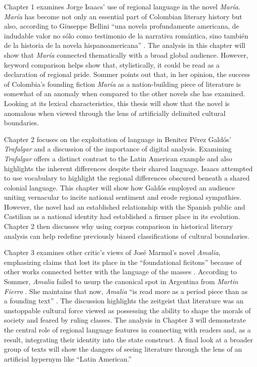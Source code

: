 \documentclass[12pt]{report}
\begin{document}
Chapter 1 examines Jorge Isaacs' use of regional language in the novel \textit{María}. 
\textit{María} has become not only an essential part of Colombian literary history but also, according to Giuseppe Bellini \enquote{una novela profundamente americana, de indudable valor no sólo como testimonio de la narrativa romántica, sino también de la historia de la novela hispanoamericana} \autocite[290]{Bellini1997}\nocite{Isaacs2012}. 
The analysis in this chapter will show that \textit{María} connected thematically with a broad global audience. 
However, keyword comparison helps show that, stylistically, it could be read as a declaration of regional pride. 
Sommer points out that, in her opinion, the success of Colombia's founding fiction \textit{María} as a nation-building piece of literature is somewhat of an anomaly when compared to the other novels she has examined. 
Looking at its lexical characteristics, this thesis will show that the novel is anomalous when viewed through the lens of artificially delimited cultural boundaries.

Chapter 2 focuses on the exploitation of language in Benitez Pérez Galdós' \textit{Trafalgar} and a discussion of the importance of digital analysis. 
Examining \textit{Trafalgar} offers a distinct contrast to the Latin American example and also highlights the inherent differences despite their shared language.
Isaacs attempted to use vocabulary to highlight the regional differences obscured beneath a shared colonial language. 
This chapter will show how Galdós employed an audience uniting vernacular to incite national sentiment and erode regional sympathies. 
However, the novel had an established relationship with the Spanish public and Castilian as a national identity had established a firmer place in its evolution.
Chapter 2 then discusses why using corpus comparison in historical literary analysis can help redefine previously biased classifications of cultural boundaries.

Chapter 3 examines other critic's views of José Marmol's novel \textit{Amalia}, emphasizing claims that lost its place in the \enquote{foundational ficitons} because of other works connected better with the language of the masses \autocite{Sommer1991}. 
According to Sommer, \textit{Amalia} failed to usurp the canonical spot in Argentina from \textit{Martin Fierro} \autocite*[111]{Sommer1991}.
She maintains that now, \textit{Amalia} \enquote{is read more as a period piece than as a founding text} \cite[111]{Sommer1991}. 
The discussion highlights the zeitgeist that literature was an unstoppable cultural force viewed as possessing the ability to shape the morals of society and feared by ruling classes. 
The analysis in Chapter 3 will demonstrate the central role of regional language features in connecting with readers and, as a result, integrating their identity into the state construct.
A final look at a broader group of texts will show the dangers of seeing literature through the lens of an artificial hypernym like \enquote{Latin American.}
\end{document}
